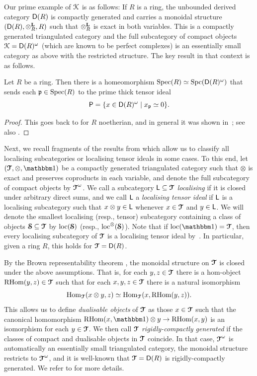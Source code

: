 \documentclass[reqno,a4paper]{amsart}
\begin{document}
Our prime example of $\mathcal{K}$ is as follows: If $R$ is a ring, the unbounded derived category $\mathsf{D}(R)$ is compactly generated and carries a monoidal structure $(\mathsf{D}(R),\otimes^\mathbf{L}_R,R)$ such that $\otimes^\mathbf{L}_R$ is exact in both variables. This is a compactly generated triangulated category and the full subcategory of compact objects $\mathcal{K}=\mathsf{D}(R)^\omega$ (which are known to be perfect complexes) is an essentially small category as above with the restricted structure. The key result in that context is as follows.

\begin{theorem}\label{thm:Spec-to-Spc}
Let $R$ be a ring. Then there is a homeomorphism $\operatorname{Spec}(R)\simeq\operatorname{Spc}(\mathsf{D}(R)^\omega)$ that sends each $\mathfrak{p}\in\operatorname{Spec}(R)$ to the prime thick tensor ideal
\[ \mathsf{P} = \{ x\in\mathsf{D}(R)^\omega \mid x_{\mathfrak{p}} \simeq 0 \}. \]
\end{theorem}

\begin{proof}
This goes back to \cite[Corollary~5.6]{balmer_spectrum} for $R$ noetherian, and in general it was shown in~\cite[Theorem~9.5]{Buan-Krause-Solberg:support-var}; see also \cite{balmer-ICM}.
\end{proof}


Next, we recall fragments of the results from \cite{balmerfavi_idempotents,  bhs23} which allow us to classify all localising subcategories or localising tensor ideals in some cases.
To this end, let $(\cT,\otimes,\unit)$ be a compactly generated triangulated category such that $\otimes$ is exact and preserves coproducts in each variable, and denote the full subcategory of compact objects by $\operatorname{\boldsymbol{\mathcal{T}}}^\omega$.
We call a subcategory $\mathsf{L}\subseteq\operatorname{\boldsymbol{\mathcal{T}}}$ \emph{localising} if it is closed under arbitrary direct sums, and we call $\mathsf{L}$ a \emph{localising tensor ideal} if $\mathsf{L}$ is a localising subcategory such that $x\otimes y\in\mathsf{L}$ whenever $x\in\operatorname{\boldsymbol{\mathcal{T}}}$ and $y\in\mathsf{L}$.
We will denote the smallest localising (resp., tensor) subcategory containing a class of objects $\operatorname{\boldsymbol{\mathcal{S}}}\subseteq\operatorname{\boldsymbol{\mathcal{T}}}$ by $\operatorname{loc}(\operatorname{\boldsymbol{\mathcal{S}}})$ (resp., $\operatorname{loc}^\otimes(\operatorname{\boldsymbol{\mathcal{S}}})$). Note that if $\loc(\unit)=\cT$, then every localising subcategory of $\operatorname{\boldsymbol{\mathcal{T}}}$ is a localising tensor ideal by~\cite[Lemma~1.4.6]{HPS:1997}. In particular, given a ring $R$, this holds for $\operatorname{\boldsymbol{\mathcal{T}}}=\mathsf{D}(R)$.

By the Brown representability theorem \cite[Theorem~3.1]{neemanBrownRep}, the monoidal structure on $\operatorname{\boldsymbol{\mathcal{T}}}$ is closed under the above assumptions. That is, for each $y,z\in\operatorname{\boldsymbol{\mathcal{T}}}$ there is a hom-object $\operatorname{RHom}(y,z)\in\operatorname{\boldsymbol{\mathcal{T}}}$ such that for each $x,y,z\in\operatorname{\boldsymbol{\mathcal{T}}}$ there is a natural isomorphism
\[ \operatorname{Hom}_{\operatorname{\boldsymbol{\mathcal{T}}}}(x\otimes y,z)\simeq\operatorname{Hom}_{\operatorname{\boldsymbol{\mathcal{T}}}}(x,\operatorname{RHom}(y,z)). \]
This allows us to define \emph{dualisable objects} of $\operatorname{\boldsymbol{\mathcal{T}}}$ as those $x\in\operatorname{\boldsymbol{\mathcal{T}}}$ such that the canonical homomorphism $\RHom(x,\unit)\otimes y\to \RHom(x,y)$ is an isomorphism for each $y\in\operatorname{\boldsymbol{\mathcal{T}}}$. We then call $\operatorname{\boldsymbol{\mathcal{T}}}$ \emph{rigidly-compactly generated} if the classes of compact and dualisable objects in $\operatorname{\boldsymbol{\mathcal{T}}}$ coincide. In that case, $\operatorname{\boldsymbol{\mathcal{T}}}^\omega$ is automatically an essentially small triangulated category, the monoidal structure restricts to $\operatorname{\boldsymbol{\mathcal{T}}}^\omega$, and it is well-known that $\operatorname{\boldsymbol{\mathcal{T}}}=\mathsf{D}(R)$ is rigidly-compactly generated. We refer to \cite{balmerfavi_idempotents,  bhs23} for more details.
\end{document}
